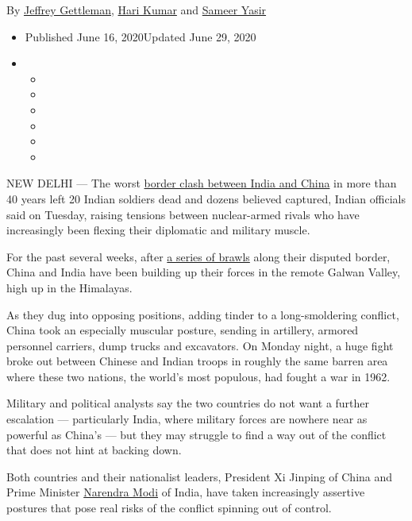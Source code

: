 By
\href{https://www.nytimes3xbfgragh.onion/by/jeffrey-gettleman}{Jeffrey
Gettleman}, \href{https://www.nytimes3xbfgragh.onion/by/hari-kumar}{Hari
Kumar} and
\href{https://www.nytimes3xbfgragh.onion/by/sameer-yasir}{Sameer Yasir}

\begin{itemize}
\item
  Published June 16, 2020Updated June 29, 2020
\item
  \begin{itemize}
  \item
  \item
  \item
  \item
  \item
  \item
  \end{itemize}
\end{itemize}

NEW DELHI --- The worst
\href{https://www.nytimes3xbfgragh.onion/2020/06/17/world/asia/india-china-border-clashes.html}{border
clash between India and China} in more than 40 years left 20 Indian
soldiers dead and dozens believed captured, Indian officials said on
Tuesday, raising tensions between nuclear-armed rivals who have
increasingly been flexing their diplomatic and military muscle.

For the past several weeks, after
\href{https://www.nytimes3xbfgragh.onion/2020/05/30/world/asia/india-china-border.html}{a
series of brawls} along their disputed border, China and India have been
building up their forces in the remote Galwan Valley, high up in the
Himalayas.

As they dug into opposing positions, adding tinder to a long-smoldering
conflict, China took an especially muscular posture, sending in
artillery, armored personnel carriers, dump trucks and excavators. On
Monday night, a huge fight broke out between Chinese and Indian troops
in roughly the same barren area where these two nations, the world's
most populous, had fought a war in 1962.

Military and political analysts say the two countries do not want a
further escalation --- particularly India, where military forces are
nowhere near as powerful as China's --- but they may struggle to find a
way out of the conflict that does not hint at backing down.

Both countries and their nationalist leaders, President Xi Jinping of
China and Prime Minister
\href{https://www.nytimes3xbfgragh.onion/2020/06/17/world/asia/india-china-border-clashes.html}{Narendra
Modi} of India, have taken increasingly assertive postures that pose
real risks of the conflict spinning out of control.

